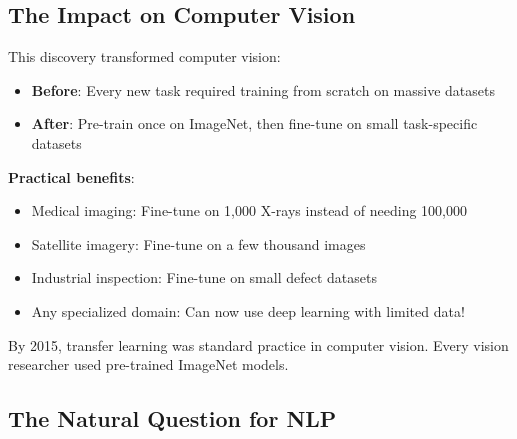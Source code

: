 \documentclass{article}
\begin{document}
\subsection{The Impact on Computer Vision}

This discovery transformed computer vision:

\begin{itemize}
\item \textbf{Before}: Every new task required training from scratch on massive datasets
\item \textbf{After}: Pre-train once on ImageNet, then fine-tune on small task-specific datasets
\end{itemize}

\textbf{Practical benefits}:
\begin{itemize}
\item Medical imaging: Fine-tune on 1,000 X-rays instead of needing 100,000
\item Satellite imagery: Fine-tune on a few thousand images
\item Industrial inspection: Fine-tune on small defect datasets
\item Any specialized domain: Can now use deep learning with limited data!
\end{itemize}

By 2015, transfer learning was standard practice in computer vision. Every vision researcher used pre-trained ImageNet models.

\subsection{The Natural Question for NLP}

\begin{center}
\end{center}
\end{document}
